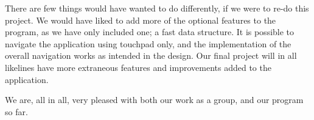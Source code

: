 \documentclass[a4paper,11pt]{article}
\begin{document}
There are few things would have wanted to do differently, if we were to re-do this project. We would have liked to add more of the optional features to the program, as we have only included one; a fast data structure.
It is possible to navigate the application using touchpad only, and the implementation of the overall navigation works as intended in the design.
Our final project will in all likelines have more extraneous features and improvements added to the application.

We are, all in all, very pleased with both our work as a group, and our program so far.
\end{document}
